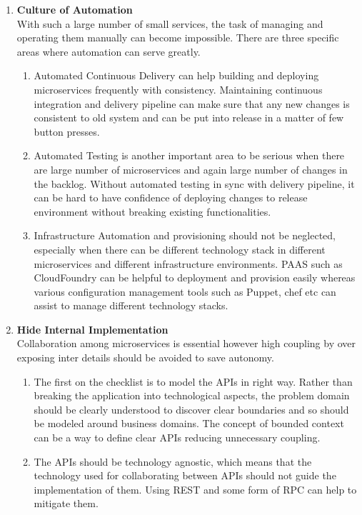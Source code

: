 \begin{enumerate}
\item \textbf{Culture of Automation}\\
With such a large number of small services, the task of managing and operating them manually can become impossible. There are three specific areas where automation can serve greatly.
\begin{enumerate}
\item Automated Continuous Delivery can help building and deploying microservices frequently with consistency. Maintaining continuous integration and delivery pipeline can make sure that any new changes is consistent to old system and can be put into release in a matter of few button presses.
\item Automated Testing is another important area to be serious when there are large number of microservices and again large number of changes in the backlog. Without automated testing in sync with delivery pipeline, it can be hard to have confidence of deploying changes to release environment without breaking existing functionalities.
\item Infrastructure Automation and provisioning should not be neglected, especially when there can be different technology stack in different microservices and different infrastructure environments. \acrshort{PAAS} such as CloudFoundry can be helpful to deployment and provision easily whereas various configuration management tools such as Puppet, chef etc can assist to manage different technology stacks.
\end{enumerate}
\item \textbf{Hide Internal Implementation}\\
Collaboration among microservices is essential however high coupling by over exposing inter details should be avoided to save autonomy.
\begin{enumerate}
\item The first on the checklist is to model the \acrshort{API}s in right way. Rather than breaking the application into technological aspects, the problem domain should be clearly understood to discover clear boundaries and so should be modeled around business domains. The concept of bounded context can be a way to define clear \acrshort{API}s reducing unnecessary coupling.
\item The \acrshort{API}s should be technology agnostic, which means that the technology used for collaborating between \acrshort{API}s should not guide the implementation of them. Using \acrshort{REST} and some form of \acrshort{RPC} can help to mitigate them.

\end{enumerate}
\end{enumerate}
